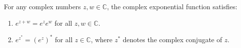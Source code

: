 For any complex numbers $z, w \in \mathbb{C}$, the complex exponential function satisfies:
\begin{enumerate}
\item[(a)] $e^{z+w} = e^z e^w$ for all $z, w \in \mathbb{C}$.
\item[(b)] $e^{z^*} = (e^z)^*$ for all $z \in \mathbb{C}$, where $z^*$ denotes the complex conjugate of $z$.
\end{enumerate}
